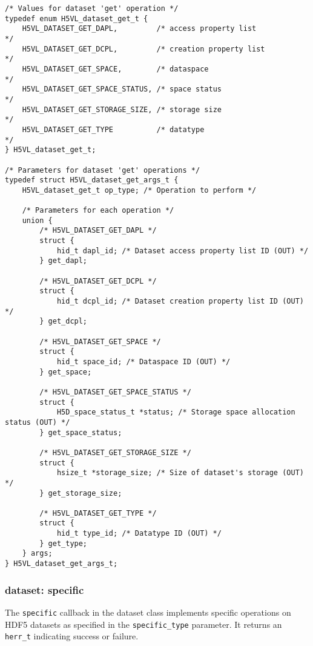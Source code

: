 \begin{lstlisting}
/* Values for dataset 'get' operation */
typedef enum H5VL_dataset_get_t {
    H5VL_DATASET_GET_DAPL,         /* access property list                */
    H5VL_DATASET_GET_DCPL,         /* creation property list              */
    H5VL_DATASET_GET_SPACE,        /* dataspace                           */
    H5VL_DATASET_GET_SPACE_STATUS, /* space status                        */
    H5VL_DATASET_GET_STORAGE_SIZE, /* storage size                        */
    H5VL_DATASET_GET_TYPE          /* datatype                            */
} H5VL_dataset_get_t;

/* Parameters for dataset 'get' operations */
typedef struct H5VL_dataset_get_args_t {
    H5VL_dataset_get_t op_type; /* Operation to perform */

    /* Parameters for each operation */
    union {
        /* H5VL_DATASET_GET_DAPL */
        struct {
            hid_t dapl_id; /* Dataset access property list ID (OUT) */
        } get_dapl;

        /* H5VL_DATASET_GET_DCPL */
        struct {
            hid_t dcpl_id; /* Dataset creation property list ID (OUT) */
        } get_dcpl;

        /* H5VL_DATASET_GET_SPACE */
        struct {
            hid_t space_id; /* Dataspace ID (OUT) */
        } get_space;

        /* H5VL_DATASET_GET_SPACE_STATUS */
        struct {
            H5D_space_status_t *status; /* Storage space allocation status (OUT) */
        } get_space_status;

        /* H5VL_DATASET_GET_STORAGE_SIZE */
        struct {
            hsize_t *storage_size; /* Size of dataset's storage (OUT) */
        } get_storage_size;

        /* H5VL_DATASET_GET_TYPE */
        struct {
            hid_t type_id; /* Datatype ID (OUT) */
        } get_type;
    } args;
} H5VL_dataset_get_args_t;
\end{lstlisting}


\subsubsection{dataset: specific}
The \texttt{specific} callback in the dataset class implements specific operations on HDF5 datasets as specified in the \texttt{specific\_type} parameter. It returns an \texttt{herr\_t} indicating success or failure.\bigskip

